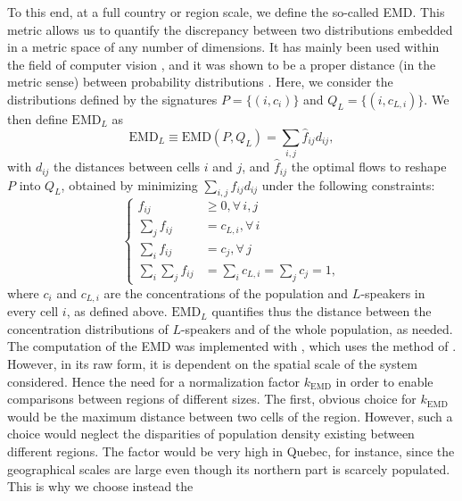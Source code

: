 \documentclass[../thesis.tex]{subfiles}
\begin{document}
To this end, at a full country or region scale, we define the so-called \ac{EMD}.
This metric allows us to quantify the discrepancy between two
distributions embedded in a metric space of any number of dimensions. It has mainly been
used within the field of computer vision \cite{RubnerMetricDistributions1998}, and it
was shown to be a proper distance (in the metric sense) between probability
distributions \cite{LevinaEarthMover2001}. Here, we consider the distributions defined
by the signatures $P = \{ (i, c_i) \}$ and $Q_L = \{ (i, c_{L,i}) \}$. We then define
$\text{EMD}_L$ as 
\begin{equation}
\label{eq:emd_def}
    \text{EMD}_L \equiv \text{EMD}(P, Q_L) = \sum_{i,j} \hat{f}_{ij} d_{ij},
\end{equation}
with $d_{ij}$ the distances between cells $i$ and $j$, and $\hat{f}_{ij}$ the optimal
flows to reshape $P$ into $Q_L$, obtained by minimizing $\sum_{i,j} f_{ij} d_{ij}$ under
the following constraints:
\begin{equation}
    \left\{
    \begin{aligned}
        f_{ij} & \geq 0, \forall \, i,j \\
        \sum_j f_{ij} & = c_{L,i}, \forall \, i \\
        \sum_i f_{ij} & = c_j, \forall \, j \\
        \sum_{i} \sum_j f_{ij} & = \sum_i c_{L,i} = \sum_j c_j = 1,
    \end{aligned}
    \right.
\end{equation}
where $c_i$ and $c_{L,i}$ are the concentrations of the population and $L$-speakers in
every cell $i$, as defined above. $\text{EMD}_L$ quantifies thus the distance between
the concentration distributions of $L$-speakers and of the whole population, as needed.
The computation of the \ac{EMD} was implemented with \cite{FlamaryPOTPython2021}, which uses
the method of \cite{BonneelDisplacementInterpolation2011}. However, in its raw form, it
is dependent on the spatial scale of the system considered. Hence the need for a
normalization factor $k_\text{EMD}$ in order to enable comparisons between regions of
different sizes. The first, obvious choice for $k_\text{EMD}$ would be the maximum
distance between two cells of the region. However, such a choice would neglect the
disparities of population density existing between different regions. The factor would
be very high in Quebec, for instance, since the geographical scales are large even
though its northern part is scarcely populated. This is why we choose instead the
\end{document}
